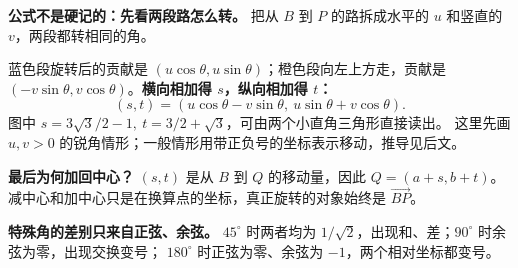\begin{explanationbox}
\textbf{公式不是硬记的：先看两段路怎么转。}
把从 $B$ 到 $P$ 的路拆成水平的 $u$ 和竖直的 $v$，两段都转相同的角。

蓝色段旋转后的贡献是 $(u\cos\theta,u\sin\theta)$；橙色段向左上方走，贡献是
$(-v\sin\theta,v\cos\theta)$。\textbf{横向相加得 $s$，纵向相加得 $t$：}
\[
(s,t)=(u\cos\theta-v\sin\theta,\ u\sin\theta+v\cos\theta).
\]
图中 $s=3\sqrt3/2-1,\ t=3/2+\sqrt3$，可由两个小直角三角形直接读出。
这里先画 $u,v>0$ 的锐角情形；一般情形用带正负号的坐标表示移动，推导见后文。

\textbf{最后为何加回中心？} $(s,t)$ 是从 $B$ 到 $Q$ 的移动量，因此
$Q=(a+s,b+t)$。减中心和加中心只是在换算点的坐标，真正旋转的对象始终是 $\overrightarrow{BP}$。

\textbf{特殊角的差别只来自正弦、余弦。}
$45^\circ$ 时两者均为 $1/\sqrt2$，出现和、差；$90^\circ$ 时余弦为零，出现交换变号；
$180^\circ$ 时正弦为零、余弦为 $-1$，两个相对坐标都变号。
\end{explanationbox}
